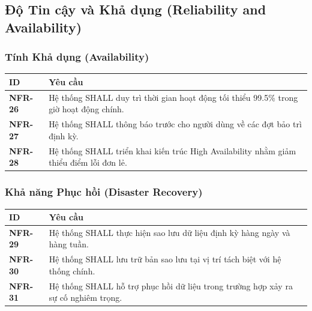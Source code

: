\documentclass[12pt, a4paper]{article}
\begin{document}
\subsection{Độ Tin cậy và Khả dụng (Reliability and Availability)}

\subsubsection{Tính Khả dụng (Availability)}

\begin{table}[H]
    \centering
    \renewcommand{\arraystretch}{1.3}

    \begin{tabularx}{\textwidth}{|l|X|}
        \hline
        \rowcolor{gray!10}
        \textbf{ID}     & \textbf{Yêu cầu}                                                                       \\
        \hline
        \textbf{NFR-26} & Hệ thống SHALL duy trì thời gian hoạt động tối thiểu 99.5\% trong giờ hoạt động chính. \\
        \hline
        \textbf{NFR-27} & Hệ thống SHALL thông báo trước cho người dùng về các đợt bảo trì định kỳ.              \\
        \hline
        \textbf{NFR-28} & Hệ thống SHALL triển khai kiến trúc High Availability nhằm giảm thiểu điểm lỗi đơn lẻ. \\
        \hline
    \end{tabularx}

\end{table}

\subsubsection{Khả năng Phục hồi (Disaster Recovery)}

\begin{table}[H]
    \centering
    \renewcommand{\arraystretch}{1.3}

    \begin{tabularx}{\textwidth}{|l|X|}
        \hline
        \rowcolor{gray!10}
        \textbf{ID}     & \textbf{Yêu cầu}                                                                   \\
        \hline
        \textbf{NFR-29} & Hệ thống SHALL thực hiện sao lưu dữ liệu định kỳ hàng ngày và hàng tuần.           \\
        \hline
        \textbf{NFR-30} & Hệ thống SHALL lưu trữ bản sao lưu tại vị trí tách biệt với hệ thống chính.        \\
        \hline
        \textbf{NFR-31} & Hệ thống SHALL hỗ trợ phục hồi dữ liệu trong trường hợp xảy ra sự cố nghiêm trọng. \\
        \hline
    \end{tabularx}

\end{table}
\end{document}
